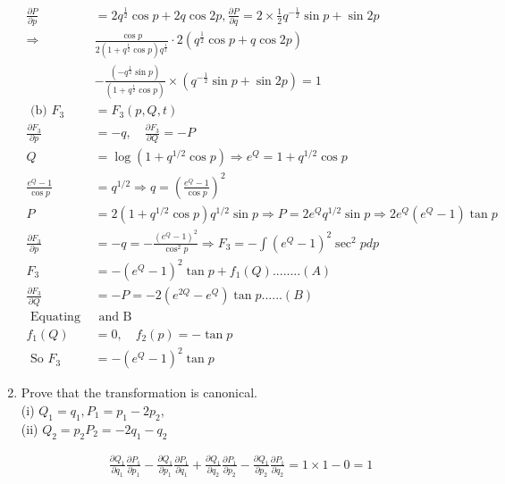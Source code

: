 \begin{enumerate}
\begin{answer}
\begin{align*}
		\frac{\partial P}{\partial p}&=2 q^{\frac{1}{2}} \cos p+2 q \cos 2 p, \frac{\partial P}{\partial q}=2 \times \frac{1}{2} q^{-\frac{1}{2}} \sin p+\sin 2 p\\
		\Rightarrow &\frac{\cos p}{2\left(1+q^{\frac{1}{2}} \cos p\right) q^{\frac{1}{2}}} \cdot 2\left(q^{\frac{1}{2}} \cos p+q \cos 2 p\right)\\&-\frac{\left(-q^{\frac{1}{2}} \sin p\right)}{\left(1+q^{\frac{1}{2}} \cos p\right)} \times\left(q^{-\frac{1}{2}} \sin p+\sin 2 p\right)=1\\
		\text { (b) } F_{3}&=F_{3}(p, Q, t)\\
		\frac{\partial F_{3}}{\partial p}&=-q, \quad \frac{\partial F_{3}}{\partial Q}=-P\\
		Q&=\log \left(1+q^{1 / 2} \cos p\right) \Rightarrow e^{Q}=1+q^{1 / 2} \cos p\\
		\frac{e^{Q}-1}{\cos p}&=q^{1 / 2} \Rightarrow q=\left(\frac{e^{Q}-1}{\cos p}\right)^{2}\\
		P&=2\left(1+q^{1 / 2} \cos p\right) q^{1 / 2} \sin p \Rightarrow P=2 e^{Q} q^{1 / 2} \sin p \Rightarrow 2 e^{Q}\left(e^{Q}-1\right) \tan p\\
		\frac{\partial F_{3}}{\partial p}&=-q=-\frac{\left(e^{Q}-1\right)^{2}}{\cos ^{2} p} \Rightarrow F_{3}=-\int\left(e^{Q}-1\right)^{2} \sec ^{2} p d p\\
		F_{3}&=-\left(e^{Q}-1\right)^{2} \tan p+f_{1}(Q)........(A)\\
		\frac{\partial F_{3}}{\partial Q}&=-P=-2\left(e^{2 Q}-e^{Q}\right) \tan p......(B)\\
		\text { Equating A }&\text{ and B}\\
		f_{1}(Q)&=0, \quad f_{2}(p)=-\tan p\\
		\text { So } F_{3}&=-\left(e^{Q}-1\right)^{2} \tan p
		\end{align*}
	\end{answer}
	\item Prove that the transformation is canonical.\\
	(i) $Q_{1}=q_{1}, P_{1}=p_{1}-2 p_{2}$,\\
	(ii) $Q_{2}=p_{2} P_{2}=-2 q_{1}-q_{2}$
	\begin{answer}
		\begin{align*}
		&\frac{\partial Q_{1}}{\partial q_{1}} \frac{\partial P_{1}}{\partial p_{1}}-\frac{\partial Q_{1}}{\partial p_{1}} \frac{\partial P_{1}}{\partial q_{1}}+\frac{\partial Q_{1}}{\partial q_{2}} \frac{\partial P_{1}}{\partial p_{2}}-\frac{\partial Q_{1}}{\partial p_{2}} \frac{\partial P_{1}}{\partial q_{2}}=1 \times 1-0=1\\

\end{align*}
\end{answer}
\end{enumerate}
